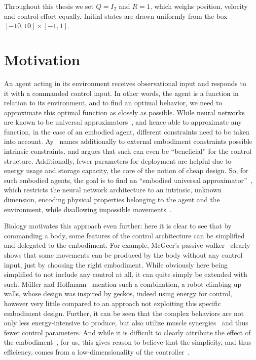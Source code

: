 Throughout this thesis we set $Q = I_2$ and $R = 1$, which weighs position,
velocity and control effort equally. Initial states are drawn uniformly from the
box $[-10, 10] \times [-1, 1]$.


\section{Motivation}
\label{sec:motivation}

An agent acting in its environment receives observational input and responds to it with a commanded
control input.
In other words, the agent is a function in relation to its environment, and to find an optimal
behavior, we need to approximate this optimal function as closely as possible. While neural networks
are known to be universal approximators~\cite{Cybenko1989Approximation,Hornik1989Multilayer}, and
hence able to approximate any function, in the case of an embodied agent, different constraints need to
be taken into account. Ay~\cite{Ay2015Geometric} names additionally to external embodiment constraints
possible intrinsic constraints, and argues that such can even be ``beneficial'' for the control
structure. Additionally, fewer parameters for deployment are helpful due to energy usage and storage
capacity, the core of the notion of cheap design.
So, for such embodied agents, the goal is to find an ``embodied universal
approximator''~\cite[p.~3]{Montufar2015CheapControl}, which restricts the neural network
architecture to an intrinsic, unknown dimension, encoding physical properties belonging to the agent
and the environment, while disallowing impossible movements~\cite[Sec.~3]{Montufar2015CheapControl}.

Biology motivates this approach even further: here it is clear to see that by commanding a body,
some features of the control architecture can be simplified and delegated to the
embodiment. For example, McGeer's passive walker~\cite{McGeer1990Passive} clearly
shows that some movements can be produced by the body without any control input, just by choosing
the right embodiment. While obviously here being simplified to not include any control at all, it
can quite simply be extended with such.
M{\"u}ller and Hoffmann~\cite[p.~4]{Mueller2017Morphological} mention such a combination, a robot
climbing up walls, whose design was inspired by geckos, indeed using energy for control, however
very little compared to an approach not exploiting this specific embodiment design. Further, it can
be seen that the complex
behaviors are not only less energy-intensive to produce, but also utilize muscle
synergies~\cite{DAvella2003Combinations} and thus fewer control parameters. And while it is
difficult to clearly attribute the effect of the embodiment~\cite{Zahedi2013Quantifying}, for us,
this gives reason to believe that the simplicity, and thus efficiency, comes from a
low-dimensionality of the controller~\cite{Montufar2015CheapControl}.

